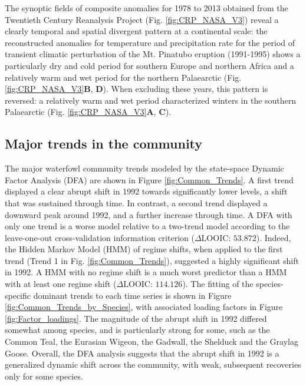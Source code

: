 \documentclass[12pt]{article}
\begin{document}
The synoptic fields of composite anomalies for 1978 to 2013 obtained from the Twentieth Century Reanalysis Project (Fig. \ref{fig:CRP_NASA_V3}) reveal a clearly temporal and spatial divergent pattern at a continental scale: the reconstructed anomalies for temperature and precipitation rate for the period of transient climatic perturbation of the Mt. Pinatubo eruption (1991-1995) shows a particularly dry and cold period for southern Europe and northern Africa and a relatively warm and wet period for the northern Palaearctic (Fig. \ref{fig:CRP_NASA_V3}\textbf{B}, \textbf{D}). When excluding these years, this pattern is reversed: a relatively warm and wet period characterized winters in the southern Palaearctic (Fig. \ref{fig:CRP_NASA_V3}\textbf{A}, \textbf{C}).\\

\subsection*{Major trends in the community}
\label{subsec:Major trends in the community}

The major waterfowl community trends modeled by the state-space Dynamic Factor Analysis (DFA) are shown in Figure \ref{fig:Common_Trends}. A first trend displayed a clear abrupt shift in 1992 towards significantly lower levels, a shift that was sustained through time. In contrast, a second trend displayed a downward peak around 1992, and a further increase through time. A DFA with only one trend is a worse model relative to a two-trend model according to the leave-one-out cross-validation information criterion ($\Delta \text{LOOIC: 53.872} $). Indeed, the Hidden Markov Model (HMM) of regime shifts, when applied to the first trend (Trend 1 in Fig. \ref{fig:Common_Trends}), suggested a highly significant shift in 1992. A HMM with no regime shift is a much worst predictor than a HMM with at least one regime shift ($\Delta \text{LOOIC: 114.126} $). The fitting of the species-specific dominant trends to each time series is shown in Figure \ref{fig:Common_Trends_by_Species}, with associated loading factors in Figure \ref{fig:Factor_loadings}. The magnitude of the abrupt shift in 1992 differed somewhat among species, and is particularly strong for some, such as the Common Teal, the Eurasian Wigeon, the Gadwall, the Shelduck and the Graylag Goose. Overall, the DFA analysis suggests that the abrupt shift in 1992 is a generalized dynamic shift across the community, with weak, subsequent recoveries only for some species.\\
\end{document}
